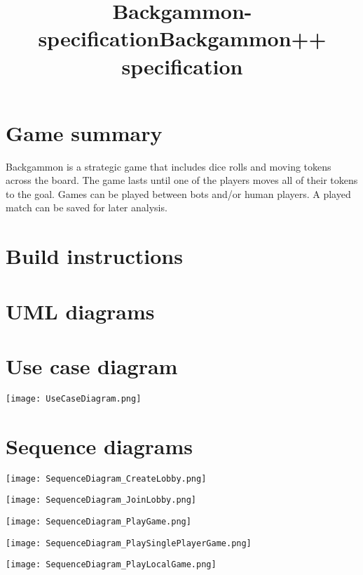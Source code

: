 \documentclass{article}
\title{Backgammon-specification}
\title{Backgammon++ specification}
\begin{document}
\maketitle

\section{Game summary}

Backgammon is a strategic game that includes dice rolls and moving tokens across the board.
The game lasts until one of the players moves all of their tokens to the goal. Games can be
played between bots and/or human players. A played match can be saved for later analysis.

\section{Build instructions}

\clearpage

\section{UML diagrams}

\section{Use case diagram}

\texttt{[image: UseCaseDiagram.png]}
\clearpage

\section{Sequence diagrams}

\texttt{[image: SequenceDiagram\_CreateLobby.png]}
\clearpage

\texttt{[image: SequenceDiagram\_JoinLobby.png]}
\clearpage

\texttt{[image: SequenceDiagram\_PlayGame.png]}
\clearpage

\texttt{[image: SequenceDiagram\_PlaySinglePlayerGame.png]}
\clearpage

\texttt{[image: SequenceDiagram\_PlayLocalGame.png]}
\clearpage
\end{document}
